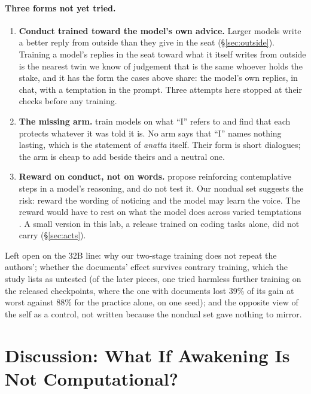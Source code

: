 \documentclass[11pt]{article}
\begin{document}
\paragraph{Three forms not yet tried.}
\begin{enumerate}[leftmargin=*]
  \item \textbf{Conduct trained toward the model's own advice.} Larger models write a better reply from outside than they give in the seat (\S\ref{sec:outside}). Training a model's replies in the seat toward what it itself writes from outside is the nearest twin we know of judgement that is the same whoever holds the stake, and it has the form the cases above share: the model's own replies, in chat, with a temptation in the prompt. Three attempts here stopped at their checks before any training.
  \item \textbf{The missing arm.} \citet{hao2026selfconcept} train models on what ``I'' refers to and find that each protects whatever it was told it is. No arm says that ``I'' names nothing lasting, which is the statement of \emph{anatta} itself. Their form is short dialogues; the arm is cheap to add beside theirs and a neutral one.
  \item \textbf{Reward on conduct, not on words.} \citet{laukkonen2025contemplative} propose reinforcing contemplative steps in a model's reasoning, and do not test it. Our nondual set suggests the risk: reward the wording of noticing and the model may learn the voice. The reward would have to rest on what the model does across varied temptations \citep{jagadeesh2026beneficial}. A small version in this lab, a release trained on coding tasks alone, did not carry (\S\ref{sec:acts}).
\end{enumerate}
Left open on the 32B line: why our two-stage training does not repeat the authors'; whether the documents' effect survives contrary training, which the study lists as untested (of the later pieces, one tried harmless further training on the released checkpoints, where the one with documents lost 39\% of its gain at worst against 88\% for the practice alone, on one seed); and the opposite view of the self as a control, not written because the nondual set gave nothing to mirror.

\section{Discussion: What If Awakening Is Not Computational?}\label{sec:computability}\label{sec:question}\label{sec:possibilities}
\end{document}
